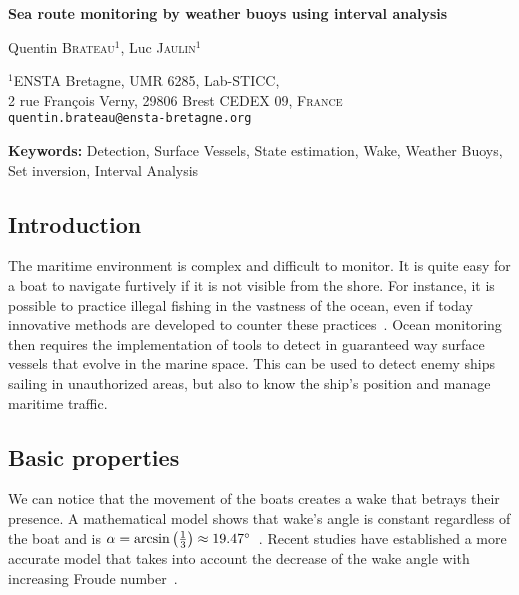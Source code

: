 \documentclass[14pt, a4paper]{article}
\begin{document}
	\begin{center}

		{\Large\bf Sea route monitoring by weather buoys using interval analysis}

		\vspace*{0.8cm}

		{\large Quentin \textsc{Brateau}$^{1}$, Luc \textsc{Jaulin}$^{1}$}

		\bigskip

		{\small $^{1}$ENSTA Bretagne, UMR 6285, Lab-STICC, \\
		2 rue François Verny, 29806 Brest CEDEX 09, \textsc{France} \\
		\texttt{quentin.brateau@ensta-bretagne.org}
		}

	\end{center}

	\bigskip

	{\noindent\bf Keywords:} Detection, Surface Vessels, State estimation, Wake, Weather Buoys, Set inversion, Interval Analysis

	\subsection*{Introduction}
		The maritime environment is complex and difficult to monitor. It is quite easy for a boat to navigate furtively if it is not visible from the shore. For instance, it is possible to practice illegal fishing in the vastness of the ocean, even if today innovative methods are developed to counter these practices~\cite{doi:10.1073/pnas.1915499117}. Ocean monitoring then requires the implementation of tools to detect in guaranteed way surface vessels that evolve in the marine space. This can be used to detect enemy ships sailing in unauthorized areas, but also to know the ship's position and manage maritime traffic.

	\subsection*{Basic properties}
		We can notice that the movement of the boats creates a wake that betrays their presence. A mathematical model shows that wake's angle is constant regardless of the boat and is $\alpha = \arcsin\left(\frac{1}{3}\right) \approx 19.47 \degree$~\cite{thomson1887ship, stoker1992water}. Recent studies have established a more accurate model that takes into account the decrease of the wake angle with increasing Froude number~\cite{Rabaud_2013}.
		
\end{document}
